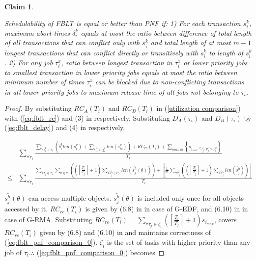 \documentclass[prodmode,acmtecs]{acmsmall}
\newtheorem{clm}{Claim}
\begin{document}
\begin{compactenum}
\begin{clm}\label{clm:fblt_pnf_edf}

Schedulability of FBLT is equal or better than PNF if: 1) For each
transaction $s_{i}^{k}$, maximum abort times $\delta_{i}^{k}$ equals
at most the ratio between difference of total length of all transactions
that can conflict only with $s_{i}^{k}$ and total length of at most
$m-1$ longest transactions that can conflict directly or transitively
with $s_{i}^{k}$ to length of $s_{i}^{k}$. 2) For any job $\tau_{i}^{x}$,
ratio between longest transaction in $\tau_{i}^{x}$ or lower priority
jobs to smallest transaction in lower priority jobs equals at most
the ratio between minimum number of times $\tau_{i}^{x}$ can be blocked
due to non-conflicting transactions in all lower priority jobs to
maximum release time of all jobs not belonging to $\tau_{i}$.

\end{clm}

\begin{proof}

By substituting $RC_{A}(T_{i})$ and $RC_{B}(T_{i})$ in (\ref{utilization comparison})
with (\ref{eq:fblt_rc}) and (3) in \cite{pnf_dac_asp} respectively.
Substituting $D_{A}(\tau_{i})$ and $D_{B}(\tau_{i})$ by (\ref{eq:fblt_delay})
and (4) in \cite{pnf_dac_asp} respectively.

\begin{eqnarray}
 & \sum_{\forall\tau_{i}}\frac{\sum_{\forall s_{i}^{k}\in s_{i}}\left(\delta_{i}^{k}len(s_{i}^{k})+\sum_{s_{iz}^{k}\in\chi_{i}^{k}}len(s_{iz}^{k})\right)+RC_{re}(T_{i})+\sum_{max\_m}\left\{ s_{j_{max},\forall\tau_{j}^{l},\, p_{j}^{l}<p_{i}^{x}}\right\} }{T_{i}}\label{eq:fblt_pnf_comparison_0}\\
\le & \sum_{\forall\tau_{i}}\frac{\sum_{\forall\tau_{j}\in\gamma_{i}}\sum_{\theta\in\theta_{i}}\left(\left(\left\lceil \frac{T_{i}}{T_{j}}\right\rceil +1\right)\sum_{\forall\bar{s_{j}^{h}}(\theta)}len\left(\bar{s_{j}^{h}}(\theta)\right)\right)+\left\lfloor \frac{1}{m}\sum_{\forall\bar{\tau_{j}^{l}}}\left(\left(\left\lceil \frac{T_{i}}{T_{j}}\right\rceil +1\right)\sum_{\forall\ddot{s_{j}^{h}}}len\left(\ddot{s_{j}^{h}}\right)\right)\right\rfloor }{T_{i}}\nonumber 
\end{eqnarray}


$\bar{s_{j}^{h}}(\theta)$ can access multiple objects. $\bar{s_{j}^{h}}(\theta)$
is included only once for all objects accessed by it. $RC_{re}(T_{i})$
is given by (6.8) in \cite{shambake_phd_proposal} in case of G-EDF,
and (6.10) in \cite{shambake_phd_proposal} in case of G-RMA. Substituting
$RC_{re}(T_{i})=\sum_{\forall\tau_{j}\in\zeta_{i}}\left(\left\lceil \frac{T_{i}}{T_{j}}\right\rceil +1\right)s_{i_{max}}$,
covers $RC_{re}(T_{i})$ given by (6.8) and (6.10) in \cite{shambake_phd_proposal}
and maintains correctness of (\ref{eq:fblt_pnf_comparison_0}). $\zeta_{i}$
is the set of tasks with higher priority than any job of $\tau_{i}$.$\therefore$
(\ref{eq:fblt_pnf_comparison_0}) becomes 


\end{proof}
\end{compactenum}
\end{document}
